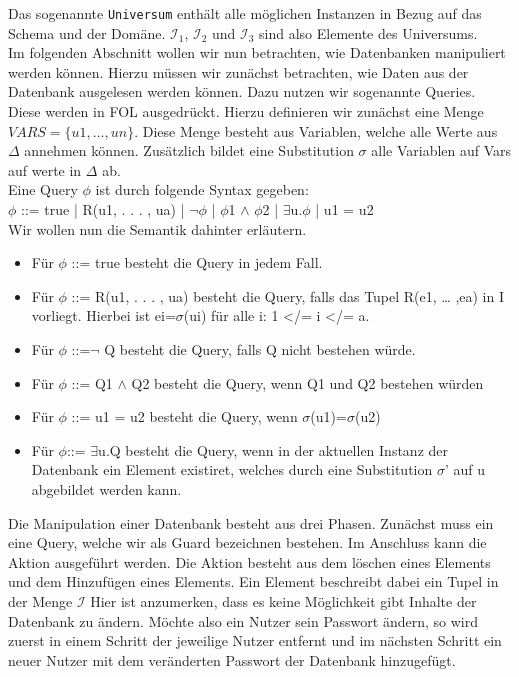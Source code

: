 Das sogenannte  \texttt{Universum} enthält alle möglichen Instanzen in Bezug auf das Schema und der Domäne. $\mathcal{I}_1$, $\mathcal{I}_2$ und $\mathcal{I}_3$ sind also Elemente des Universums.\\
Im folgenden Abschnitt wollen wir nun betrachten, wie Datenbanken manipuliert werden können. 
Hierzu müssen wir zunächst betrachten, wie Daten aus der Datenbank ausgelesen werden können. 
Dazu nutzen wir sogenannte Queries. Diese werden in FOL ausgedrückt. Hierzu definieren wir zunächst eine Menge $VARS = \{u1,…,un\}$. Diese Menge besteht aus Variablen, welche alle Werte aus ${\Delta}$ annehmen können. Zusätzlich bildet eine Substitution ${\sigma}$ alle Variablen auf Vars auf werte in ${\Delta}$ ab. \\
 Eine Query ${\phi}$ ist durch folgende Syntax gegeben: \\
${\phi}$ ::= true | R(u1, . . . , ua) | ${\neg}{\phi}$ | ${\phi}$1 $\wedge$ ${\phi}$2 | $\exists$u.${\phi}$ | u1 = u2 \\
Wir wollen nun die Semantik dahinter erläutern.
\begin{itemize}
\item Für ${\phi}$ ::= true besteht die Query in jedem Fall.
\item Für ${\phi}$ ::= R(u1, . . . , ua) besteht die Query, falls das Tupel R(e1, … ,ea) in I vorliegt. Hierbei ist ei=${\sigma}$(ui) für alle i: 1 </= i </= a.
\item Für ${\phi}$ ::=${\neg}$ Q besteht die Query, falls Q nicht bestehen würde. 
\item Für ${\phi}$ ::= Q1 $\wedge$ Q2 besteht die Query, wenn Q1 und Q2  bestehen würden
\item Für ${\phi}$ ::= u1 = u2  besteht die Query, wenn ${\sigma}$(u1)=${\sigma}$(u2)
\item Für ${\phi}$::= $\exists$u.Q besteht die Query, wenn in der aktuellen Instanz der Datenbank ein Element existiret, welches durch eine Substitution  ${\sigma}$' auf u abgebildet werden kann. 
\end{itemize}
Die Manipulation einer Datenbank besteht aus drei Phasen. Zunächst muss ein eine Query, welche wir als Guard bezeichnen bestehen. Im Anschluss kann die Aktion ausgeführt werden. Die Aktion besteht aus dem löschen eines Elements und dem Hinzufügen eines Elements. Ein Element beschreibt dabei ein Tupel in der Menge $\mathcal{I}$ Hier ist anzumerken, dass es keine Möglichkeit gibt Inhalte der Datenbank zu ändern. Möchte also ein Nutzer sein Passwort ändern, so wird zuerst in einem Schritt der jeweilige Nutzer entfernt und im nächsten Schritt ein neuer Nutzer mit dem veränderten Passwort der Datenbank hinzugefügt.









